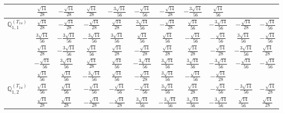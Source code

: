 \documentclass[fleqn,10pt,landscape]{article}
\begin{document}
\begin{itemize}
{\begin{center}
\begin{longtable}{ccccccccccc}
& $ \frac{\sqrt{14}}{28} $ & $ - \frac{\sqrt{14}}{28} $ & $ \frac{\sqrt{14}}{28} $ & $ - \frac{3 \sqrt{14}}{56} $ & $ - \frac{\sqrt{14}}{56} $ & $ - \frac{\sqrt{14}}{28} $ & $ - \frac{3 \sqrt{14}}{56} $ & $ \frac{\sqrt{14}}{56} $ & $  $ & $  $ \\ \hline
$\mathbb{Q}_{1,1}^{(T_{1u})}$ & $ \frac{\sqrt{14}}{28} $ & $ - \frac{\sqrt{14}}{28} $ & $ - \frac{\sqrt{14}}{28} $ & $ \frac{\sqrt{14}}{28} $ & $ \frac{3 \sqrt{14}}{56} $ & $ - \frac{\sqrt{14}}{28} $ & $ \frac{\sqrt{14}}{56} $ & $ - \frac{3 \sqrt{14}}{56} $ & $ - \frac{\sqrt{14}}{28} $ & $ - \frac{\sqrt{14}}{56} $ \\
& $ \frac{3 \sqrt{14}}{56} $ & $ - \frac{3 \sqrt{14}}{56} $ & $ - \frac{3 \sqrt{14}}{56} $ & $ \frac{3 \sqrt{14}}{56} $ & $ \frac{\sqrt{14}}{56} $ & $ \frac{\sqrt{14}}{56} $ & $ - \frac{\sqrt{14}}{56} $ & $ - \frac{\sqrt{14}}{56} $ & $ \frac{3 \sqrt{14}}{56} $ & $ - \frac{\sqrt{14}}{56} $ \\
& $ \frac{\sqrt{14}}{28} $ & $ - \frac{3 \sqrt{14}}{56} $ & $ \frac{\sqrt{14}}{56} $ & $ \frac{\sqrt{14}}{28} $ & $ - \frac{\sqrt{14}}{28} $ & $ \frac{\sqrt{14}}{28} $ & $ \frac{\sqrt{14}}{28} $ & $ - \frac{\sqrt{14}}{28} $ & $ - \frac{3 \sqrt{14}}{56} $ & $ \frac{\sqrt{14}}{28} $ \\
& $ - \frac{\sqrt{14}}{56} $ & $ \frac{3 \sqrt{14}}{56} $ & $ \frac{\sqrt{14}}{28} $ & $ \frac{\sqrt{14}}{56} $ & $ - \frac{3 \sqrt{14}}{56} $ & $ \frac{3 \sqrt{14}}{56} $ & $ \frac{3 \sqrt{14}}{56} $ & $ - \frac{3 \sqrt{14}}{56} $ & $ - \frac{\sqrt{14}}{56} $ & $ - \frac{\sqrt{14}}{56} $ \\
& $ \frac{\sqrt{14}}{56} $ & $ \frac{\sqrt{14}}{56} $ & $ - \frac{3 \sqrt{14}}{56} $ & $ \frac{\sqrt{14}}{56} $ & $ - \frac{\sqrt{14}}{28} $ & $ \frac{3 \sqrt{14}}{56} $ & $ - \frac{\sqrt{14}}{56} $ & $ - \frac{\sqrt{14}}{28} $ & $  $ & $  $ \\ \hline
$\mathbb{Q}_{1,2}^{(T_{1u})}$ & $ \frac{\sqrt{14}}{56} $ & $ \frac{\sqrt{14}}{56} $ & $ - \frac{\sqrt{14}}{56} $ & $ - \frac{\sqrt{14}}{56} $ & $ - \frac{\sqrt{14}}{56} $ & $ \frac{3 \sqrt{14}}{56} $ & $ \frac{\sqrt{14}}{28} $ & $ - \frac{\sqrt{14}}{56} $ & $ - \frac{3 \sqrt{14}}{56} $ & $ - \frac{\sqrt{14}}{28} $ \\
& $ \frac{\sqrt{14}}{28} $ & $ \frac{\sqrt{14}}{28} $ & $ - \frac{\sqrt{14}}{28} $ & $ - \frac{\sqrt{14}}{28} $ & $ \frac{3 \sqrt{14}}{56} $ & $ - \frac{3 \sqrt{14}}{56} $ & $ \frac{3 \sqrt{14}}{56} $ & $ - \frac{3 \sqrt{14}}{56} $ & $ \frac{\sqrt{14}}{56} $ & $ \frac{\sqrt{14}}{28} $ \\

\end{longtable}
\end{center}}
\end{itemize}
\end{document}

